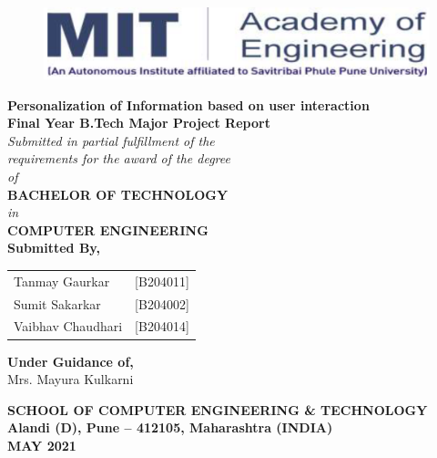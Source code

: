 
\newpage
\begin{center}

\begin{figure}[h!]
    \begin{center}
        \includegraphics[scale=0.35]{mitnlogo}
    \end{center}
\end{figure}

\LARGE{\textbf{Personalization of Information based on user interaction}} \\ [10mm]
\large{\textbf {Final Year B.Tech Major Project Report}} \\ [4mm]

\large{\textit{{Submitted in partial fulfillment of the}}}\\
\large{\textit{{requirements for the award of the degree}}} \\ [2mm]
\large{\textit{{of}}}\\[2mm]
\large{\textbf {BACHELOR OF TECHNOLOGY}} \\ [2mm]
\large{\textit{{in}}}\\[2mm]
\large{\textbf {COMPUTER ENGINEERING}}\\ [10mm]
\large{\textbf {Submitted By,}} \\ [2mm]

\begin{center}
\begin{tabular}{ll}
Tanmay Gaurkar  & [B204011]\\
Sumit Sakarkar  & [B204002] \\
Vaibhav Chaudhari  & [B204014] \\

\end{tabular}

\vspace{4mm}
\textbf{Under Guidance of,}\\[2mm]
Mrs. Mayura Kulkarni

\end{center}

\vspace*{5mm}

\LARGE{\textbf{SCHOOL OF COMPUTER ENGINEERING \& TECHNOLOGY}} \\ [2mm]

\vspace{5mm}
\Large\textbf{Alandi (D), Pune -- 412105, Maharashtra (INDIA)} \\ [10mm]
\LARGE{\textbf{MAY 2021}}

\end{center}

